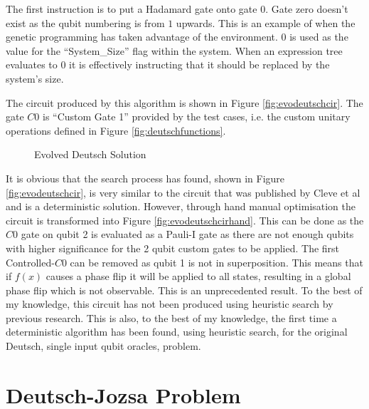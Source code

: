 The first instruction is to put a Hadamard gate onto gate $0$.
Gate zero doesn't exist as the qubit numbering is from $1$ upwards.
This is an example of when the genetic programming has taken advantage of the environment.
$0$ is used as the value for the ``System\_Size'' flag within the system.
When an expression tree evaluates to $0$ it is effectively instructing that it should be replaced by the system's size.

The circuit produced by this algorithm is shown in Figure \ref{fig:evodeutschcir}.
The gate $C0$ is ``Custom Gate 1'' provided by the test cases, i.e. the custom unitary operations defined in Figure \ref{fig:deutschfunctions}.

\begin{figure}
\centering
{}
\caption{Evolved Deutsch Solution}
\end{figure}

It is obvious that the search process has found, shown in Figure \ref{fig:evodeutschcir}, is very similar to the circuit that was published by Cleve et al\cite{Cleve98quantumalgorithms} and is a deterministic solution.
However, through hand manual optimisation the circuit is transformed into Figure \ref{fig:evodeutschcirhand}.
This can be done as the $C0$ gate on qubit 2 is evaluated as a Pauli-I gate as there are not enough qubits with higher significance for the 2 qubit custom gates to be applied.
The first Controlled-$C0$ can be removed as qubit 1 is not in superposition.
This means that if $f(x)$ causes a phase flip it will be applied to all states, resulting in a global phase flip which is not observable.
This is an unprecedented result.
To the best of my knowledge, this circuit has not been produced using heuristic search by previous research.
This is also, to the best of my knowledge, the first time a deterministic algorithm has been found, using heuristic search, for the original Deutsch, single input qubit oracles, problem.

\section{Deutsch-Jozsa Problem}
\label{sec:deutschjozsaexperiment}

